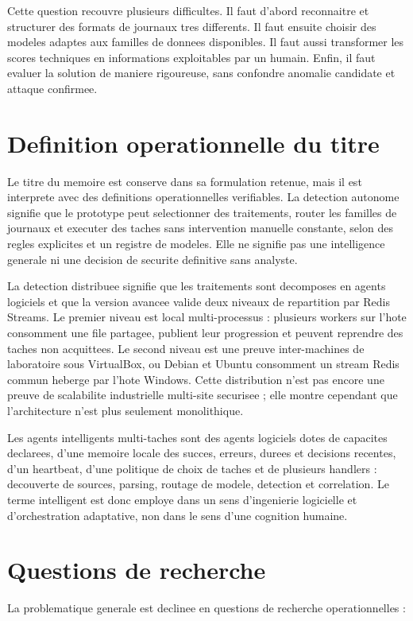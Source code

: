 Cette question recouvre plusieurs difficultes. Il faut d'abord reconnaitre et structurer des formats de journaux tres differents. Il faut ensuite choisir des modeles adaptes aux familles de donnees disponibles. Il faut aussi transformer les scores techniques en informations exploitables par un humain. Enfin, il faut evaluer la solution de maniere rigoureuse, sans confondre anomalie candidate et attaque confirmee.

\section{Definition operationnelle du titre}
Le titre du memoire est conserve dans sa formulation retenue, mais il est interprete avec des definitions operationnelles verifiables. La detection autonome signifie que le prototype peut selectionner des traitements, router les familles de journaux et executer des taches sans intervention manuelle constante, selon des regles explicites et un registre de modeles. Elle ne signifie pas une intelligence generale ni une decision de securite definitive sans analyste.

La detection distribuee signifie que les traitements sont decomposes en agents logiciels et que la version avancee valide deux niveaux de repartition par Redis Streams. Le premier niveau est local multi-processus : plusieurs workers sur l'hote consomment une file partagee, publient leur progression et peuvent reprendre des taches non acquittees. Le second niveau est une preuve inter-machines de laboratoire sous VirtualBox, ou Debian et Ubuntu consomment un stream Redis commun heberge par l'hote Windows. Cette distribution n'est pas encore une preuve de scalabilite industrielle multi-site securisee ; elle montre cependant que l'architecture n'est plus seulement monolithique.

Les agents intelligents multi-taches sont des agents logiciels dotes de capacites declarees, d'une memoire locale des succes, erreurs, durees et decisions recentes, d'un heartbeat, d'une politique de choix de taches et de plusieurs handlers : decouverte de sources, parsing, routage de modele, detection et correlation. Le terme intelligent est donc employe dans un sens d'ingenierie logicielle et d'orchestration adaptative, non dans le sens d'une cognition humaine.

\section{Questions de recherche}
La problematique generale est declinee en questions de recherche operationnelles :

